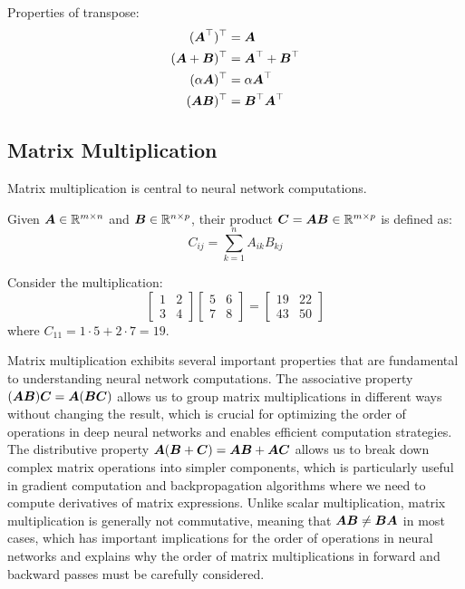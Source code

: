 Properties of transpose:
\begin{align}
    (\boldsymbol{A}^\top)^\top &= \boldsymbol{A} \\
    (\boldsymbol{A} + \boldsymbol{B})^\top &= \boldsymbol{A}^\top + \boldsymbol{B}^\top \\
    (\alpha\boldsymbol{A})^\top &= \alpha\boldsymbol{A}^\top \\
    (\boldsymbol{AB})^\top &= \boldsymbol{B}^\top\boldsymbol{A}^\top
\end{align}

\subsection{Matrix Multiplication}

Matrix multiplication is central to neural network computations.

\begin{definition}
Given $\boldsymbol{A} \in \mathbb{R}^{m \times n}$ and $\boldsymbol{B} \in \mathbb{R}^{n \times p}$, their product $\boldsymbol{C} = \boldsymbol{AB} \in \mathbb{R}^{m \times p}$ is defined as:
\begin{equation}
    C_{ij} = \sum_{k=1}^{n} A_{ik}B_{kj}
\end{equation}
\end{definition}

\begin{example}
Consider the multiplication:
\begin{equation}
    \begin{bmatrix} 1 & 2 \\ 3 & 4 \end{bmatrix}
    \begin{bmatrix} 5 & 6 \\ 7 & 8 \end{bmatrix}
    = \begin{bmatrix} 19 & 22 \\ 43 & 50 \end{bmatrix}
\end{equation}
where $C_{11} = 1 \cdot 5 + 2 \cdot 7 = 19$.
\end{example}

Matrix multiplication exhibits several important properties that are fundamental to understanding neural network computations. The associative property $(\boldsymbol{AB})\boldsymbol{C} = \boldsymbol{A}(\boldsymbol{BC})$ allows us to group matrix multiplications in different ways without changing the result, which is crucial for optimizing the order of operations in deep neural networks and enables efficient computation strategies. The distributive property $\boldsymbol{A}(\boldsymbol{B} + \boldsymbol{C}) = \boldsymbol{AB} + \boldsymbol{AC}$ allows us to break down complex matrix operations into simpler components, which is particularly useful in gradient computation and backpropagation algorithms where we need to compute derivatives of matrix expressions. Unlike scalar multiplication, matrix multiplication is generally not commutative, meaning that $\boldsymbol{AB} \neq \boldsymbol{BA}$ in most cases, which has important implications for the order of operations in neural networks and explains why the order of matrix multiplications in forward and backward passes must be carefully considered.

